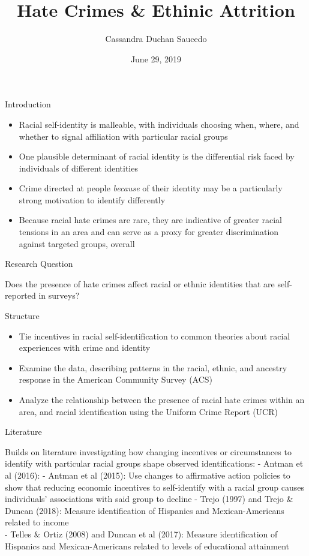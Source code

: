\documentclass[ignorenonframetext,]{beamer}
\title{Hate Crimes \& Ethinic Attrition}
\author{Cassandra Duchan Saucedo}
\date{June 29, 2019}
\providecommand{\tightlist}{%
  \setlength{\itemsep}{0pt}\setlength{\parskip}{0pt}}
\begin{document}
\frame{\titlepage}

\begin{frame}{Introduction}

\begin{itemize}
\tightlist
\item
  Racial self-identity is malleable, with individuals choosing when,
  where, and whether to signal affiliation with particular racial groups
\item
  One plausible determinant of racial identity is the differential risk
  faced by individuals of different identities
\item
  Crime directed at people \emph{because} of their identity may be a
  particularly strong motivation to identify differently
\item
  Because racial hate crimes are rare, they are indicative of greater
  racial tensions in an area and can serve as a proxy for greater
  discrimination against targeted groups, overall
\end{itemize}

\end{frame}

\begin{frame}{Research Question}

Does the presence of hate crimes affect racial or ethnic identities that
are self-reported in surveys?

\end{frame}

\begin{frame}{Structure}

\begin{itemize}
\tightlist
\item
  Tie incentives in racial self-identification to common theories about
  racial experiences with crime and identity
\item
  Examine the data, describing patterns in the racial, ethnic, and
  ancestry response in the American Community Survey (ACS)
\item
  Analyze the relationship between the presence of racial hate crimes
  within an area, and racial identification using the Uniform Crime
  Report (UCR)
\end{itemize}

\end{frame}

\begin{frame}{Literature}

Builds on literature investigating how changing incentives or
circumstances to identify with particular racial groups shape observed
identifications: - Antman et al (2016): - Antman et al (2015): Use
changes to affirmative action policies to show that reducing economic
incentives to self-identify with a racial group causes individuals'
associations with said group to decline - Trejo (1997) and Trejo \&
Duncan (2018): Measure identification of Hispanics and Mexican-Americans
related to income\\
- Telles \& Ortiz (2008) and Duncan et al (2017): Measure identification
of Hispanics and Mexican-Americans related to levels of educational
attainment

\end{frame}
\end{document}
